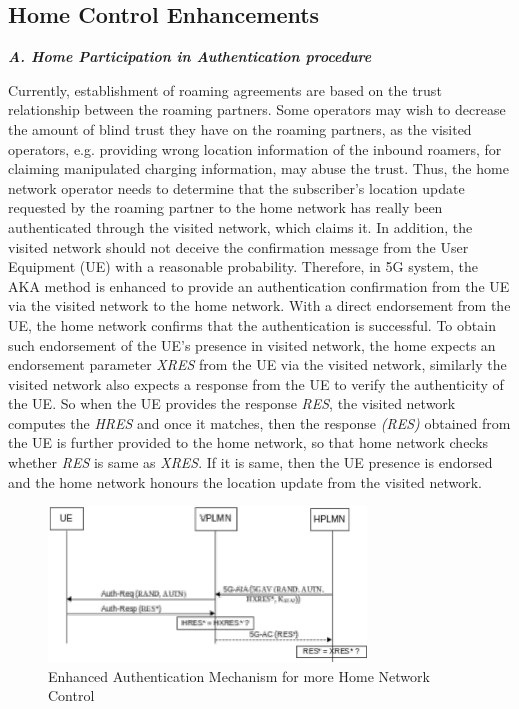 \begin{multicols}{2}

\section{Home Control Enhancements}

\noindent
{\bf {\textit{A. Home Participation in Authentication procedure}}}

Currently, establishment of roaming agreements are based on the trust relationship between the roaming partners. Some operators may wish to decrease the amount of blind trust they have on the roaming partners, as the visited operators, e.g. providing wrong location information of the inbound roamers, for claiming manipulated charging information, may abuse the trust. Thus, the home network operator needs to determine that the subscriber’s location update requested by the roaming partner to the home network has really been authenticated through the visited network, which claims it. In addition, the visited network should not deceive the confirmation message from the User Equipment (UE) with a reasonable probability. Therefore, in 5G system, the AKA method is enhanced to provide an authentication confirmation from the UE via the visited network to the home network. With a direct endorsement from the UE, the home network confirms that the authentication is successful. To obtain such endorsement of the UE’s presence in visited network, the home expects an endorsement parameter \textit{XRES} from the UE via the visited network, similarly the visited network also expects a response from the UE to verify the authenticity of the UE. So when the UE provides the response \textit{RES}, the visited network computes the \textit{HRES} and once it matches, then the response \textit{(RES)} obtained from the UE is further provided to the home network, so that home network checks whether \textit{RES} is same as \textit{XRES}. If it is same, then the UE presence is endorsed and the home network honours the location update from the visited network. 
\begin{figure}[H]
\centering
\includegraphics[scale=3]{src/Figures/chap4/chap4-fig02.jpg}
\caption{ Enhanced Authentication Mechanism for more Home Network Control}\label{chap4-fig02}
\end{figure}


\end{multicols}
